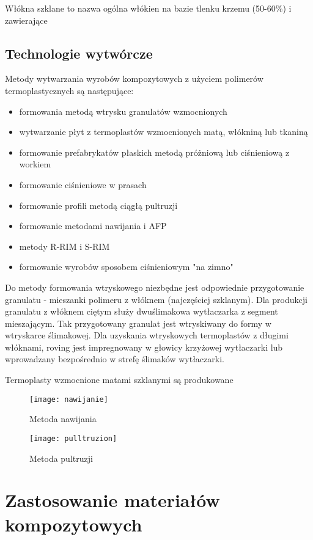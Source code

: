 \documentclass[magister,druk]{dyplom}
\begin{document}
Włókna szklane to nazwa ogólna włókien na bazie tlenku krzemu (50-60\%) i zawierające


\subsection{Technologie wytwórcze}

Metody wytwarzania wyrobów kompozytowych z użyciem polimerów termoplastycznych są następujące:
\begin{itemize}	
	\item formowania metodą wtrysku granulatów wzmocnionych
	\item wytwarzanie płyt z termoplastów wzmocnionych matą, włókniną lub tkaniną
	\item formowanie prefabrykatów płaskich metodą próżniową lub ciśnieniową z workiem
	\item formowanie ciśnieniowe w prasach
	\item formowanie profili metodą ciągłą pultruzji
	\item formowanie metodami nawijania i AFP
	\item metody R-RIM i S-RIM
	\item formowanie wyrobów sposobem ciśnieniowym "na zimno"
\end{itemize}

Do metody formowania wtryskowego niezbędne jest odpowiednie przygotowanie granulatu - mieszanki polimeru z włóknem (najczęściej szklanym). Dla produkcji granulatu z włóknem ciętym służy dwuślimakowa wytłaczarka z segment mieszającym. Tak przygotowany granulat jest wtryskiwany do formy w wtryskarce ślimakowej. Dla uzyskania wtryskowych termoplastów z długimi włóknami, roving jest impregnowany w głowicy krzyżowej wytłaczarki lub wprowadzany bezpośrednio w strefę ślimaków wytłaczarki.

Termoplasty wzmocnione matami szklanymi są produkowane 

\begin{figure}[H]
	\texttt{[image: nawijanie]}
	\caption{Metoda nawijania\cite{Chawla1998}}
\end{figure}

\begin{figure}[H]
	\texttt{[image: pulltruzion]}
	\caption{Metoda pultruzji\cite{Chawla1998}}
\end{figure}

\section{Zastosowanie materiałów kompozytowych}
\end{document}
